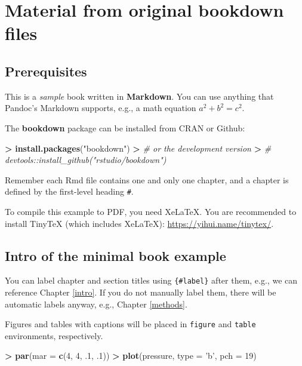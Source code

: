 \documentclass[]{book}
\newenvironment{Shaded}{\begin{snugshade}}{\end{snugshade}}
\newcommand{\KeywordTok}[1]{\textcolor[rgb]{0.13,0.29,0.53}{\textbf{#1}}}
\newcommand{\DataTypeTok}[1]{\textcolor[rgb]{0.13,0.29,0.53}{#1}}
\newcommand{\DecValTok}[1]{\textcolor[rgb]{0.00,0.00,0.81}{#1}}
\newcommand{\StringTok}[1]{\textcolor[rgb]{0.31,0.60,0.02}{#1}}
\newcommand{\CommentTok}[1]{\textcolor[rgb]{0.56,0.35,0.01}{\textit{#1}}}
\newcommand{\OperatorTok}[1]{\textcolor[rgb]{0.81,0.36,0.00}{\textbf{#1}}}
\newcommand{\ErrorTok}[1]{\textcolor[rgb]{0.64,0.00,0.00}{\textbf{#1}}}
\newcommand{\NormalTok}[1]{#1}
\theoremstyle{definition}
\theoremstyle{definition}
\theoremstyle{definition}
\theoremstyle{remark}
\begin{document}
\section{Material from original bookdown
files}\label{material-from-original-bookdown-files}

\subsection{Prerequisites}\label{prerequisites}

This is a \emph{sample} book written in \textbf{Markdown}. You can use
anything that Pandoc's Markdown supports, e.g., a math equation
\(a^2 + b^2 = c^2\).

The \textbf{bookdown} package can be installed from CRAN or Github:

\begin{Shaded}
\begin{Highlighting}[]
\OperatorTok{>}\StringTok{ }\KeywordTok{install.packages}\NormalTok{(}\StringTok{"bookdown"}\NormalTok{)}
\OperatorTok{>}\StringTok{ }\CommentTok{# or the development version}
\ErrorTok{>}\StringTok{ }\CommentTok{# devtools::install_github("rstudio/bookdown")}
\end{Highlighting}
\end{Shaded}

Remember each Rmd file contains one and only one chapter, and a chapter
is defined by the first-level heading \texttt{\#}.

To compile this example to PDF, you need XeLaTeX. You are recommended to
install TinyTeX (which includes XeLaTeX):
\url{https://yihui.name/tinytex/}.

\subsection{Intro of the minimal book
example}\label{intro-of-the-minimal-book-example}

You can label chapter and section titles using \texttt{\{\#label\}}
after them, e.g., we can reference Chapter \ref{intro}. If you do not
manually label them, there will be automatic labels anyway, e.g.,
Chapter \ref{methods}.

Figures and tables with captions will be placed in \texttt{figure} and
\texttt{table} environments, respectively.

\begin{Shaded}
\begin{Highlighting}[]
\OperatorTok{>}\StringTok{ }\KeywordTok{par}\NormalTok{(}\DataTypeTok{mar =} \KeywordTok{c}\NormalTok{(}\DecValTok{4}\NormalTok{, }\DecValTok{4}\NormalTok{, .}\DecValTok{1}\NormalTok{, .}\DecValTok{1}\NormalTok{))}
\OperatorTok{>}\StringTok{ }\KeywordTok{plot}\NormalTok{(pressure, }\DataTypeTok{type =} \StringTok{'b'}\NormalTok{, }\DataTypeTok{pch =} \DecValTok{19}\NormalTok{)}
\end{Highlighting}
\end{Shaded}
\end{document}
